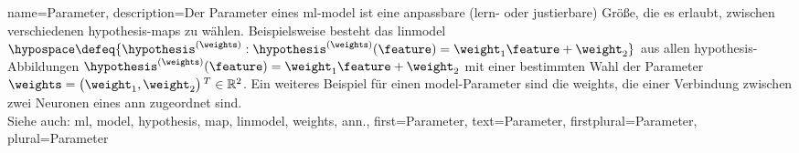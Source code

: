 {{{{
{name={Parameter},
	description={Der Parameter eines \gls{ml}-\gls{model} ist eine anpassbare 
		(lern- oder justierbare) Größe, die es erlaubt, zwischen verschiedenen 
		\gls{hypothesis}-\glspl{map} zu wählen. Beispielsweise besteht das \gls{linmodel} 
		$\hypospace \defeq \{\hypothesis^{(\weights)}: \hypothesis^{(\weights)}(\feature)= \weight_{1} \feature + \weight_{2}\}$ 
		aus allen \gls{hypothesis}-Abbildungen $\hypothesis^{(\weights)}(\feature)= \weight_{1} \feature + \weight_{2}$ 
		mit einer bestimmten Wahl der Parameter $\weights = \big(\weight_{1},\weight_{2}\big)\,^{T} \in \mathbb{R}^{2}$. 
		Ein weiteres Beispiel für einen \gls{model}-Parameter sind die \gls{weights}, 
		die einer Verbindung zwischen zwei Neuronen eines \gls{ann} zugeordnet sind.
				\\
		Siehe auch: \gls{ml}, \gls{model}, \gls{hypothesis}, \gls{map}, \gls{linmodel}, \gls{weights}, \gls{ann}.},
	first={Parameter},
	text={Parameter},
	firstplural={Parameter}, 
	plural={Parameter}
}


}}}}
